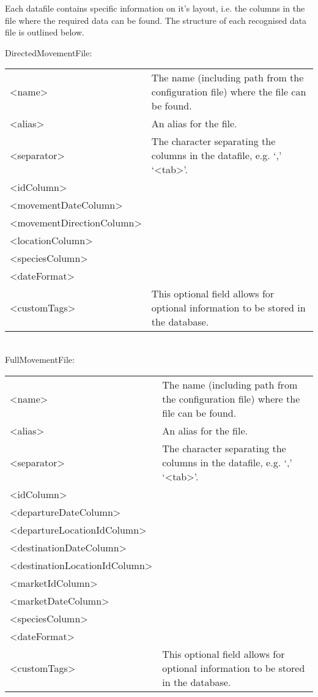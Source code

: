 Each datafile contains specific information on it’s layout, i.e. the columns in the file where the required data can be found. The structure of each recognised data file is outlined below.

DirectedMovementFile:

\begin{tabulary}{0.3\linewidth}{l p{9cm}}
\toprule
<name> & The name (including path from the configuration file) where the file can be found. \\
<alias> & An alias for the file. \\
<separator> & The character separating the columns in the datafile, e.g. `,' `<tab>'.\\
<idColumn> &  \\
<movementDateColumn> &  \\
<movementDirectionColumn> &  \\
<locationColumn> &  \\
<speciesColumn> &  \\
<dateFormat> &  \\
<customTags> & This optional field allows for optional information to be stored in the database. \\
\bottomrule
\end{tabulary}\\

FullMovementFile:

\begin{tabulary}{1.0\textwidth}{l p{9cm}}
\toprule
<name> & The name (including path from the configuration file) where the file can be found.\\
<alias> & An alias for the file.\\
<separator> & The character separating the columns in the datafile, e.g. `,' `<tab>'.\\
<idColumn> & \\
<departureDateColumn> & \\
<departureLocationIdColumn> & \\
<destinationDateColumn> & \\
<destinationLocationIdColumn> & \\
<marketIdColumn> & \\
<marketDateColumn> & \\
<speciesColumn> & \\
<dateFormat> & \\
<customTags> & This optional field allows for optional information to be stored in the database.\\
\bottomrule
\end{tabulary}\\

